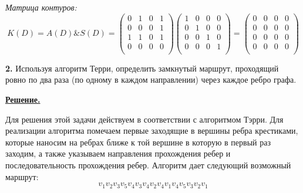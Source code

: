 \documentclass[12pt, letterpaper, titlepage]{article}
\begin{document}
\emph{Матрица контуров:}
\begin{equation}
    K(D)=A(D) \& S(D) = 
    \begin{pmatrix}
        0 & 1 & 0 & 1\\
        0 & 0 & 0 & 1\\
        1 & 1 & 0 & 1\\
        0 & 0 & 0 & 0\\
    \end{pmatrix}
    \begin{pmatrix}
        1 & 0 & 0 & 0\\
        0 & 1 & 0 & 0\\
        0 & 0 & 1 & 0\\
        0 & 0 & 0 & 1\\
    \end{pmatrix}
    =
    \begin{pmatrix}
        0 & 0 & 0 & 0\\
        0 & 0 & 0 & 0\\
        0 & 0 & 0 & 0\\
        0 & 0 & 0 & 0\\
    \end{pmatrix}
\end{equation}

\textbf{2.} Используя алгоритм Терри, определить замкнутый маршрут, проходящий ровно по два раза
(по одному в каждом направлении) через каждое ребро графа.

\underline{\textbf{Решение.}}

Для решения этой задачи действуем в соответствии с алгоритмом Тэрри.
Для реализации алгоритма помечаем первые заходящие в вершины ребра крестиками, которые наносим на 
ребрах ближе к той вершине в которую в первый
раз заходим, а также указываем направления прохождения ребер и последовательность
прохождения ребер. Алгоритм дает следующий возможный маршрут:
\begin{equation*}
    v_1v_2v_3v_5v_4v_3v_4v_2v_4v_1v_4v_5v_3v_2v_1
\end{equation*}

\center
\end{document}
